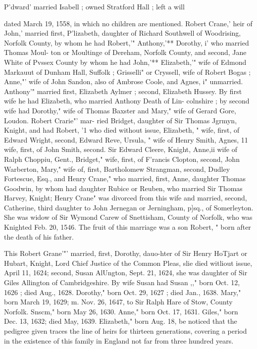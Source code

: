 \documentclass[oneside]{book}
\begin{document}
P'dward' married Isabell ; owned Stratford Hall ; left a will 

dated March 19, 1558, in which no children are mentioned. 
Robert Crane,' heir of John,' married first, P'lizabeth, daughter 
of Richard Southwell of Woodrising, Norfolk County, by whom he 
had Robert,'" Anthony,'** Dorothy, i' who married Thomas Moul- 
ton or Moultinge of Dereham, Norfolk County, and second, Jane 
White of Pvssex County by whom he had John,'** Elizabeth,'" 
wife of Edmond Markauut of Dunham Hall, Suffolk ; Grisselli" 
or Cryssell, wife of Robert Bogas ; Anne,"' wife of John Sandon, 
also of Ambrose Coole, and Agnes, i" unmarried. Anthony'" 
married first, Elizabeth Aylmer ; second, Elizabeth Hussey. By 
first wife he had Elizabeth, who married Anthony Death of Lin- 
colnshire ; by second wife had Dorothy," wife of Thomas Baxster 
and Mary," wife of Gerard Gore, Loudon. Robert Crarie"' mar- 
ried Bridget, daughter of Sir Thomas Jgrmyn, Knight, and had 
Robert, '1 who died without issue, Elizabeth, " wife, first, of 
Edward Wright, second, Edward Reve, Ursula, " wife of Henry 
Smith, Agnes, 11 wife, first, of John Smith, second. Sir Edward 
Cleere, Knight, Anne,ii wife of Ralph Choppiu, Gent., Bridget," 
wife, first, of F'rancis Clopton, second, John Warberton, Mary," 
wife of, first, Bartholomew Strangman, second, Dudley Fortescue, 
Esq., and Henry Crane," who married, first, Anne, daughter 
Thomas Goodwin, by whom had daughter Rubice or Reuben, 
who married Sir Thomas Harvey, Knight; Henry Crane" was 
divorced from this wife and married, second, Catherine, third 
daughter to John Jernegan or Jerningham, p]sq., of Somerleyton. 
She was widow of Sir Wymond Carew of Snettisham, County of 
Norfolk, who was Knighted Feb. 20, 1546. The fruit of this 
marriage was a son Robert, " born after the death of his father. 




This Robert Grane'"' married, first, Dorothy, dauo-hter of Sir 
Henry HoTjart or Hubart, Knight, Lord Chief Justice of the 
Common Pleas, slie died witliout issue, April 11, 1624; second, 
Susan AlUngton, Sept. 21, 1624, she was daughter of Sir Giles 
Allington of Cambridgeshire. By wife Susan had Susan ,," born 
Oct. 12, 1626 ; died Aug., 1628. Dorothy," born Oct. 29, 1627 ; 
died Jan., 1638. Mary," born March 19, 1629; m. Nov. 26, 
1647, to Sir Ralph Hare of Stow, County Norfolk. Snscm," 
born May 26, 1630. Anne," born Oct. 17, 1631. Giles," born 
Dec. 13, 1632; died May, 1639. Elizabeth," born Aug. 18, 
be noticed that the pedigree given traces the line of heirs for 
thirteen generations, covering a period in the existence of this 
family in England not far from three hundred years. 
\end{document}
